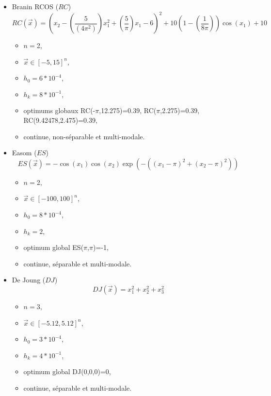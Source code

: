 \begin{itemize}
	\bigskip
	\bigskip
	\item
	Branin RCOS 
	($RC$)\\$$RC(\overrightarrow{x})=\left(x_2-\left(\frac{5}{(4\pi^2)}\right)x_1^2+\left(\frac{5}{\pi}\right)x_1-6\right)^2+10\left(1-\left(\frac{1}{8\pi}\right)\right)\cos(x_1) +10$$

	\bigskip

	\begin{itemize}[label={$\circ$}]
		\item $n=$2, 
		\item $\overrightarrow{x} \in [-5,15]^n$,
		\item $h_0=6*10^{-4}$,
		\item $h_k=8*10^{-1}$,
		\item optimums globaux RC(-$\pi$,12.275)=0.39, RC($\pi$,2.275)=0.39, RC(9.42478,2.475)=0.39,
		\item continue, non-séparable et multi-modale.
	\end{itemize}
	
	\bigskip
	\bigskip
	\item
	Easom ($ES$)\\$$ES(\overrightarrow{x})= -\cos (x_1)\cos (x_2) \exp (-((x_1-\pi )^2+(x_2-\pi)^2))$$

	\begin{itemize}[label={$\circ$}]
		\item $n=$2,
		\item $\overrightarrow{x} \in [-100,100]^n$,
		\item $h_0=8*10^{-4}$,
		\item $h_k=2$,
		\item optimum global ES($\pi$,$\pi$)=-1,
		\item continue, séparable et multi-modale.
	\end{itemize}
	
	\bigskip
	\bigskip
	\item
	De Joung ($DJ$)\\$$DJ(\overrightarrow{x})= x_1^2+x_2^2+x_3^2$$
	
	\begin{itemize}[label={$\circ$}]
		\item $n=$3, 
		\item $\overrightarrow{x} \in [-5.12,5.12]^n$,
		\item $h_0=3*10^{-4}$,
		\item $h_k=4*10^{-1}$,
		\item optimum global DJ(0,0,0)=0,
		\item continue, séparable et multi-modale.
	\end{itemize}
	

\end{itemize}
